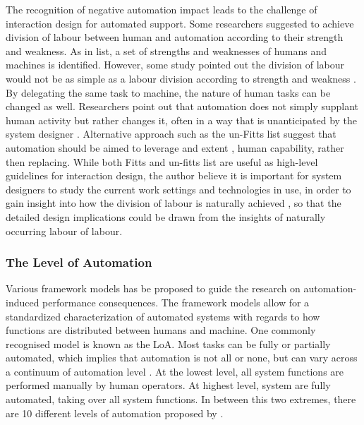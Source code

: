 The recognition of negative automation impact leads to the challenge of interaction design for automated support.  Some researchers suggested to achieve division of labour between human and automation according to their strength and weakness. As in \cite{Fitts} list, a set of strengths and weaknesses of humans and machines is identified. However, some study pointed out the division of labour would not be as simple as a labour division according to strength and weakness \cite{Bradshaw2011}. By delegating the same task to machine, the nature of human tasks can be changed as well. Researchers point out that automation does not simply supplant human activity but rather changes it, often in a way that is unanticipated by the system designer \cite{Bradshaw2011}. Alternative approach such as the un-Fitts list \cite{Hoffman2002} suggest that automation should be aimed to leverage and extent , human capability, rather then replacing.  While both Fitts and un-fitts list are useful as high-level guidelines for interaction design, the author believe it is important for system designers to study the current work settings and technologies in use, in order to gain insight into how the division of labour is naturally achieved \cite{Crabtree2012}, so that the detailed design implications could be drawn from the insights of naturally occurring labour of labour. \\


\subsubsection{The Level of Automation}\label{sec:lrloa}
Various framework models has be proposed to guide the research on automation-induced performance consequences. The framework models allow for a standardized characterization of automated systems with regards to how functions are distributed between humans and machine. One commonly recognised model is known as the \acf{LoA}. Most tasks can be fully or partially automated, which implies that automation is not all or none, but can vary across a continuum of automation level \cite{Wickens2010}. At the lowest level, all system functions are performed manually by human operators.  At highest level, system are fully automated, taking over all system functions. In between this two extremes, there are 10 different levels of automation proposed by \cite{Wickens2010}. \\

